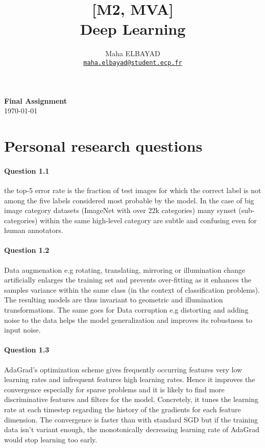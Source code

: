 \documentclass[10pt]{article}
\title{[M2, MVA]\\ Deep Learning}
\author{Maha ELBAYAD\\ \href{mailto:maha.elbayad@student.ecp.fr}{\tt maha.elbayad@student.ecp.fr}}
\date{}
\begin{document}
\maketitle
\vspace{-10pt}
\begin{center}
{\huge \bf Final Assignment}\\
\today
\vspace{10pt}
\end{center}

\vspace{7pt}

\section{Personal research questions}
	\paragraph{Question 1.1} the top-5 error rate is the fraction of test images for which the correct label is not among the five labels considered most probable by the model. In the case of big image category datasets (ImageNet with over 22k categories) many synset (sub-categories) within the same high-level category are subtle and confusing even for human annotators.

	\paragraph{Question 1.2}  Data augmenation e.g rotating, translating, mirroring or illumination change artificially enlarges the training set and prevents over-fitting as it enhances the samples variance within the same class (in the context of classification problems). The resulting models are thus invariant to geometric and illumination transformations. The same goes for Data corruption e.g distorting and adding noise to the data helps the model generalization and improves its robustness to input noise.

	\paragraph{Question 1.3} AdaGrad's optimization scheme gives frequently occurring features very low learning rates and infrequent features high learning rates. Hence it improves the convergence especially for sparse problems and it is likely to find more discriminative features and filters for the model. Concretely, it tunes the learning rate at each timestep regarding the history of the gradients for each feature dimension. The convergence is faster than with standard SGD but if the training data isn't variant enough, the monotonically decreasing learning rate of AdaGrad would stop learning too early.
\end{document}
